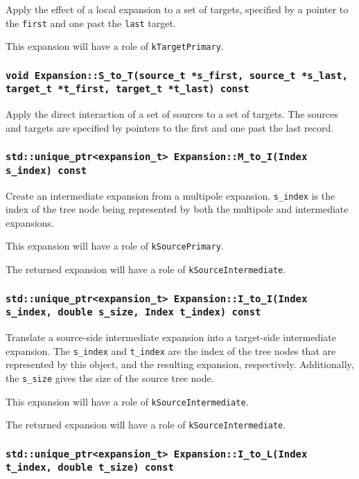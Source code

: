 Apply the effect of a local expansion to a set of targets, specified by
a pointer to the \texttt{first} and one past the \texttt{last} target.

This expansion will have a role of \texttt{kTargetPrimary}.

\subsubsection{\texttt{void Expansion::S\_to\_T(source\_t *s\_first, source\_t *s\_last, target\_t *t\_first, target\_t *t\_last) const}}

Apply the direct interaction of a set of sources to a set of targets. The
sources and targets are specified by pointers to the first and one past the
last record.

\subsubsection{\texttt{std::unique\_ptr<expansion\_t> Expansion::M\_to\_I(Index s\_index) const}}

Create an intermediate expansion from a multipole expansion. \texttt{s\_index}
is the index of the tree node being represented by both the multipole and
intermediate expansions.

This expansion will have a role of \texttt{kSourcePrimary}.

The returned expansion will have a role of \texttt{kSourceIntermediate}.

\subsubsection{\texttt{std::unique\_ptr<expansion\_t> Expansion::I\_to\_I(Index s\_index, double s\_size, Index t\_index) const}}

Translate a source-side intermediate expansion into a target-side intermediate
expansion. The \texttt{s\_index} and \texttt{t\_index} are the index of the
tree nodes that are represented by this object, and the resulting expansion,
respectively. Additionally, the \texttt{s\_size} gives the size of the source
tree node.

This expansion will have a role of \texttt{kSourceIntermediate}.

The returned expansion will have a role of \texttt{kSourceIntermediate}.

\subsubsection{\texttt{std::unique\_ptr<expansion\_t> Expansion::I\_to\_L(Index t\_index, double t\_size) const}}


